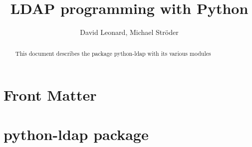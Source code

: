 \documentclass{manual}
\title{LDAP programming with Python}
\author{David Leonard, Michael Str\"oder}
\begin{document}
\maketitle

\ifhtml
\chapter*{Front Matter\label{front}}
\fi

\begin{abstract}
\noindent
This document describes the package python-ldap with its various modules
\end{abstract}

\tableofcontents

\chapter{python-ldap package}








\renewcommand{\indexname}{Module Index}

\renewcommand{\indexname}{Index}
\end{document}
